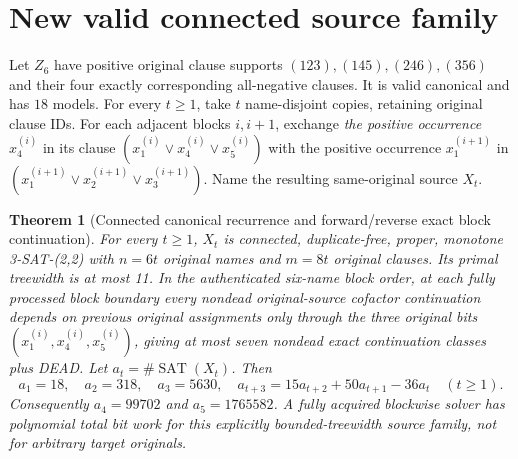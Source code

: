 \documentclass[11pt]{article}
\newtheorem{theorem}{Theorem}
\begin{document}
\section{New valid connected source family}
Let $Z_6$ have positive original clause supports $(123),(145),(246),(356)$ and their four exactly corresponding all-negative clauses. It is valid canonical and has $18$ models. For every $t\ge1$, take $t$ name-disjoint copies, retaining original clause IDs. For each adjacent blocks $i,i+1$, exchange \emph{the positive occurrence} $x^{(i)}_4$ in its clause $(x^{(i)}_1\vee x^{(i)}_4\vee x^{(i)}_5)$ with the positive occurrence $x^{(i+1)}_1$ in $(x^{(i+1)}_1\vee x^{(i+1)}_2\vee x^{(i+1)}_3)$. Name the resulting same-original source $X_t$.

\begin{theorem}[Connected canonical recurrence and forward/reverse exact block continuation]
For every $t\ge1$, $X_t$ is connected, duplicate-free, proper, monotone 3-SAT-(2,2) with $n=6t$ original names and $m=8t$ original clauses. Its primal treewidth is at most 11. In the authenticated six-name block order, at each fully processed block boundary every nondead original-source cofactor continuation depends on previous original assignments only through the three original bits $(x_1^{(i)},x_4^{(i)},x_5^{(i)})$, giving at most seven nondead exact continuation classes plus DEAD. Let $a_t=\#\operatorname{SAT}(X_t)$. Then
\[
\boxed{a_1=18,\quad a_2=318,\quad a_3=5630,\quad
a_{t+3}=15a_{t+2}+50a_{t+1}-36a_t\quad(t\ge1).}
\]
Consequently $a_4=99702$ and $a_5=1765582$. A fully acquired blockwise solver has polynomial total bit work for this explicitly bounded-treewidth source family, not for arbitrary target originals.
\end{theorem}
\end{document}
